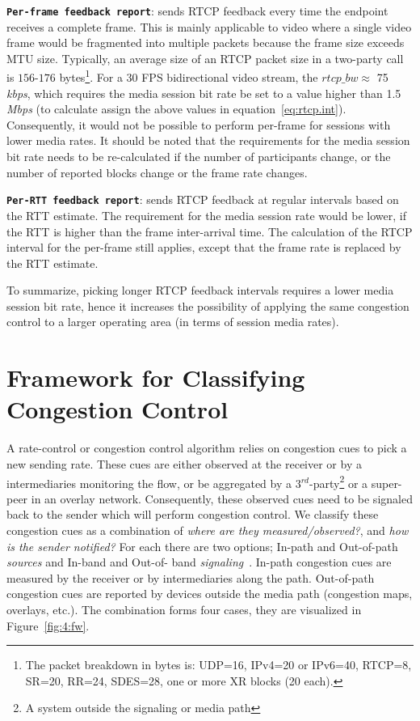 \textbf{\texttt{Per-frame feedback report}}: sends RTCP feedback every time
the endpoint receives a complete frame. This is mainly applicable to video
where a single video frame would be fragmented into multiple packets because
the frame size exceeds MTU size. Typically, an average size of an RTCP packet
size in a two-party call is $156$-$176$ bytes\footnote{The packet breakdown in
bytes is: UDP=16, IPv4=20 or IPv6=40, RTCP=8, SR=20, RR=24, SDES=28, one or
more XR blocks (20 each).}. For a 30 FPS bidirectional video stream, the
$rtcp\_bw \approx$ 75\,\emph{kbps}, which requires the media session bit rate
be set to a value higher than 1.5\,\emph{Mbps} (to calculate assign the above
values in equation~\ref{eq:rtcp.int}). Consequently, it would not be possible
to perform per-frame for sessions with lower media rates. It should be noted
that the requirements for the media session bit rate needs to be re-calculated
if the number of participants change, or the number of reported blocks change
or the frame rate changes.

\textbf{\texttt{Per-RTT feedback report}}: sends RTCP feedback at regular
intervals based on the RTT estimate. The requirement for the media session
rate would be lower, if the RTT is higher than the frame inter-arrival time.
The calculation of the RTCP interval for the per-frame still applies, except
that the frame rate is replaced by the RTT estimate.

To summarize, picking longer RTCP feedback intervals requires a lower media
session bit rate, hence it increases the possibility of applying the same
congestion control to a larger operating area (in terms of session media
rates).

\section{Framework for Classifying Congestion Control}
\label{fw.fw}

A rate-control or congestion control algorithm relies on congestion cues to
pick a new sending rate. These cues are either observed at the receiver or by
a intermediaries monitoring the flow, or be aggregated by a
3$^{rd}$-party\footnote{A system outside the signaling or media path} or a
super-peer in an overlay network. Consequently, these observed cues need to be
signaled back to the sender which will perform congestion control. We classify
these congestion cues as a combination of \emph{where are they
measured/observed?}, and \emph{how is the sender notified?} For each there are
two options; In-path and Out-of-path \emph{sources} and In-band and Out-of-%
band \emph{signaling}~\cite{Singh:PhDFw}. In-path congestion cues are measured
by the receiver or by intermediaries along the path. Out-of-path congestion
cues are reported by devices outside the media path (congestion maps,
overlays, etc.). The combination forms four cases, they are visualized in
Figure~\ref{fig:4:fw}.

